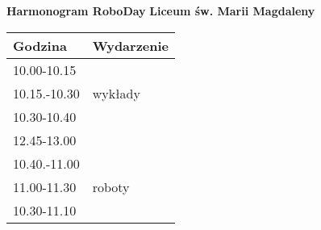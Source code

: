 \documentclass{article}
\begin{document}
\begin{center}
\Large\textbf{Harmonogram RoboDay}
\large\textbf{Liceum św. Marii Magdaleny}
\end{center}
\vspace{1cm}
\begin{center}
\begin{tabular}{|l|l|}
\hline
\textbf{Godzina} & \textbf{Wydarzenie} \\
\hline
10.00-10.15 &  \\
\hline
10.15.-10.30 & wykłady \\
\hline
10.30-10.40 &  \\
\hline
12.45-13.00 &  \\
\hline
10.40.-11.00 &  \\
\hline
11.00-11.30 & roboty \\
\hline
10.30-11.10 &  \\
\hline
\end{tabular}
\end{center}
\end{document}
